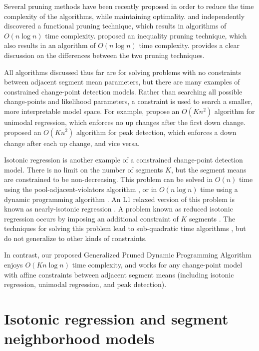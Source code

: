 \documentclass{article}
\begin{document}
Several pruning methods have been recently proposed in order to reduce
the time complexity of the algorithms, while maintaining optimality.
\citet{pruned-dp} and \citet{phd-johnson} independently discovered a
functional pruning technique, which results in algorithms of
$O(n\log n)$ time complexity. \citet{pelt} proposed an inequality
pruning technique, which also results in an algorithm of $O(n\log n)$
time complexity. \citet{fpop} provides a clear discussion on the
differences between the two pruning techniques.

All algorithms discussed thus far are for solving problems with no
constraints between adjacent segment mean parameters, but there are
many examples of constrained change-point detection models. Rather
than searching all possible change-points and likelihood parameters, a
constraint is used to search a smaller, more interpretable model
space. For example, \citet{haiminen2008algorithms} propose an
$O(Kn^2)$ algorithm for unimodal regression, which enforces no up
changes after the first down change. \citet{HOCKING-PeakSeg} proposed
an $O(Kn^2)$ algorithm for peak detection, which enforces a down
change after each up change, and vice versa.

Isotonic regression is another example of a constrained change-point
detection model. There is no limit on the number of segments $K$, but
the segment means are constrained to be non-decreasing. This problem
can be solved in $O(n)$ time using the pool-adjacent-violators
algorithm \citep{mair2009isotone}, or in $O(n\log n)$ time using a
dynamic programming algorithm \citep{isotonic-dp}. An L1 relaxed
version of this problem is known as nearly-isotonic regression
\citep{tibshirani2011nearly}. A problem known as reduced isotonic
regression occurs by imposing an additional constraint of $K$ segments
\citep{reduced-monotonic-regression}. The techniques for solving this
problem lead to sub-quadratic time algorithms
\citep{hardwick2014optimal}, but do not generalize to other kinds of
constraints.

In contrast, our proposed Generalized Pruned Dynamic Programming
Algorithm enjoys $O(Kn\log n)$ time complexity, and works for any
change-point model with affine constraints between adjacent segment
means (including isotonic regression, unimodal regression, and peak
detection).



\section{Isotonic regression and segment neighborhood models}
\label{sec:models}
\end{document}
